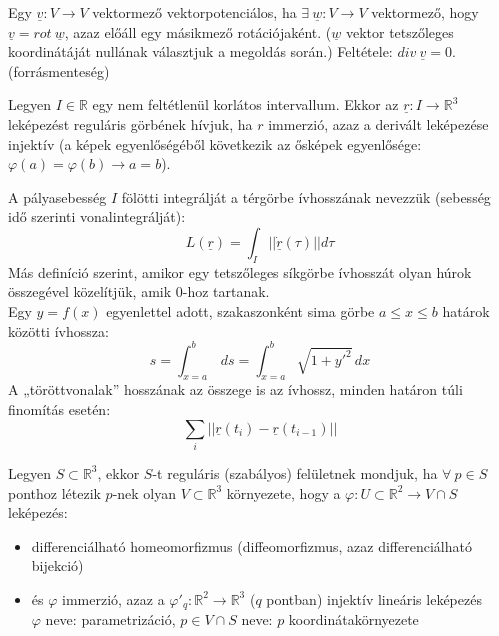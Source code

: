 \documentclass[11pt,a4paper]{article}
\begin{document}
    \begin{tcolorbox}[colback=red!5!white,colframe=red!60!black,title= 2. Vektorpotenciálos vektormező]
        Egy $\underline{v}:V \rightarrow V$ vektormező vektorpotenciálos, ha $\exists\ \underline{w}: V \rightarrow V$ vektormező, hogy $\underline{v} = rot\ \underline{w}$, azaz előáll egy másikmező rotációjaként. ($\underline{w}$ vektor tetszőleges koordinátáját nullának választjuk a megoldás során.)
        Feltétele: $div\ \underline{v} = 0$. (forrásmenteség)
    \end{tcolorbox}

    \begin{tcolorbox}[colback=red!5!white,colframe=red!60!black,title= 3. Görbe]
        Legyen $I \in \mathbb{R}$ egy nem feltétlenül korlátos intervallum. Ekkor az $\underline{r}:I \rightarrow \mathbb{R}^3$ leképezést reguláris görbének hívjuk, ha $r$ immerzió, azaz a derivált leképezése injektív (a képek egyenlőségéből következik az ősképek egyenlősége: $\varphi(a) = \varphi(b) \rightarrow a = b$).
    \end{tcolorbox}

    \begin{tcolorbox}[colback=red!5!white,colframe=red!60!black,title= 4. Görbe ívhossza]
        A pályasebesség $I$ fölötti integrálját a térgörbe ívhosszának nevezzük (sebesség idő szerinti vonalintegrálját):
        $$L(\underline{r}) = \int_{I}\left|\left|\dot{\underline{r}}(\tau)\right|\right|d\tau$$
        Más definíció szerint, amikor egy tetszőleges síkgörbe ívhosszát olyan húrok összegével közelítjük, amik 0-hoz tartanak.\\
        Egy $y = f(x)$ egyenlettel adott, szakaszonként sima görbe $a \leq x \leq b$ határok közötti ívhossza:
        $$s = \int_{x=a}^{b} \,ds = \int_{x=a}^{b} \sqrt{1+y'^2} \,dx$$
        A „töröttvonalak” hosszának az összege is az ívhossz, minden határon túli finomítás esetén:
        $$\sum_{i}\left|\left|\underline{r}(t_i) - \underline{r}(t_{i-1})\right|\right|$$
    \end{tcolorbox}

    \begin{tcolorbox}[colback=red!5!white,colframe=red!60!black,title= 5. Felület]
        Legyen $S \subset \mathbb{R}^3$, ekkor $S$-t reguláris (szabályos) felületnek mondjuk, ha $\forall\ p \in S$ ponthoz létezik $p$-nek olyan $V \subset \mathbb{R}^3$ környezete, hogy a $\varphi:U \subset \mathbb{R}^2 \rightarrow V \cap S$ leképezés:
            \begin{itemize}
                \item differenciálható homeomorfizmus (diffeomorfizmus, azaz differenciálható bijekció)
                \item és $\varphi$ immerzió, azaz a $\varphi'_q:\mathbb{R}^2 \rightarrow \mathbb{R}^3$ ($q$ pontban) injektív lineáris leképezés\\
                $\varphi$ neve: parametrizáció, $p \in V \cap S$ neve: $p$ koordinátakörnyezete
            \end{itemize}
    \end{tcolorbox}
\end{document}
